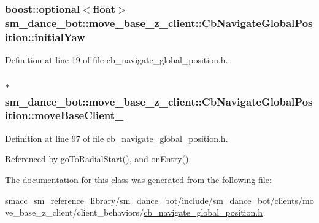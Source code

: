 \subsubsection[{\texorpdfstring{initial\+Yaw}{initialYaw}}]{\setlength{\rightskip}{0pt plus 5cm}boost\+::optional$<$float$>$ sm\+\_\+dance\+\_\+bot\+::move\+\_\+base\+\_\+z\+\_\+client\+::\+Cb\+Navigate\+Global\+Position\+::initial\+Yaw}\hypertarget{classsm__dance__bot_1_1move__base__z__client_1_1CbNavigateGlobalPosition_a2466eeabb6e2a3f35427a444a369d45e}{}\label{classsm__dance__bot_1_1move__base__z__client_1_1CbNavigateGlobalPosition_a2466eeabb6e2a3f35427a444a369d45e}


Definition at line 19 of file cb\+\_\+navigate\+\_\+global\+\_\+position.\+h.

\subsubsection[{\texorpdfstring{move\+Base\+Client\+\_\+}{moveBaseClient_}}]{$\ast$ sm\+\_\+dance\+\_\+bot\+::move\+\_\+base\+\_\+z\+\_\+client\+::\+Cb\+Navigate\+Global\+Position\+::move\+Base\+Client\+\_\+\hspace{0.3cm}{\ttfamily [private]}}\hypertarget{classsm__dance__bot_1_1move__base__z__client_1_1CbNavigateGlobalPosition_a579eaa06b93cc396b2ff615a786c495f}{}\label{classsm__dance__bot_1_1move__base__z__client_1_1CbNavigateGlobalPosition_a579eaa06b93cc396b2ff615a786c495f}


Definition at line 97 of file cb\+\_\+navigate\+\_\+global\+\_\+position.\+h.



Referenced by go\+To\+Radial\+Start(), and on\+Entry().



The documentation for this class was generated from the following file\+:\begin{DoxyCompactItemize}
\item 
smacc\+\_\+sm\+\_\+reference\+\_\+library/sm\+\_\+dance\+\_\+bot/include/sm\+\_\+dance\+\_\+bot/clients/move\+\_\+base\+\_\+z\+\_\+client/client\+\_\+behaviors/\hyperlink{smacc__sm__reference__library_2sm__dance__bot_2include_2sm__dance__bot_2clients_2move__base__z__4f98f2fc60ce0041c06779ddc6689af4}{cb\+\_\+navigate\+\_\+global\+\_\+position.\+h}\end{DoxyCompactItemize}
